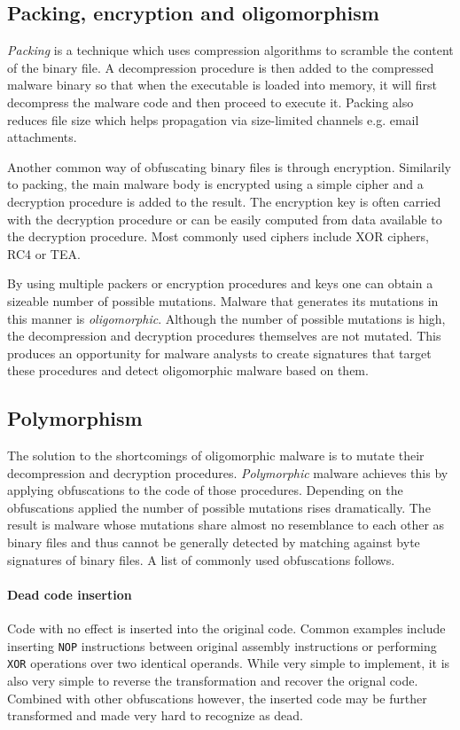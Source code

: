 \subsection{Packing, encryption and oligomorphism}
\emph{Packing} is a technique which uses compression algorithms to scramble the content of the binary file\cite{Symatec08}. A decompression procedure is then added to the compressed malware binary so that when the executable is loaded into memory, it will first decompress the malware code and then proceed to execute it. Packing also reduces file size which helps propagation via size-limited channels e.g. email attachments. 

Another common way of obfuscating binary files is through encryption. Similarily to packing, the main malware body is encrypted using a simple cipher and a decryption procedure is added to the result. The encryption key is often carried with the decryption procedure or can be easily computed from data available to the decryption procedure. Most commonly used ciphers include XOR ciphers, RC4 or TEA. 

By using multiple packers or encryption procedures and keys one can obtain a sizeable number of possible mutations. Malware that generates its mutations in this manner is \emph{oligomorphic}. Although the number of possible mutations is high, the decompression and decryption procedures themselves are not mutated. This produces an opportunity for malware analysts to create signatures that target these procedures and detect oligomorphic malware based on them.

\subsection{Polymorphism}
\label{s_polymorph}
The solution to the shortcomings of oligomorphic malware is to mutate their decompression and decryption procedures. \emph{Polymorphic} malware achieves this by applying obfuscations to the code of those procedures. Depending on the obfuscations applied the number of possible mutations rises dramatically. The result is malware whose mutations share almost no resemblance to each other as binary files and thus cannot be generally detected by matching against byte signatures of binary files. A list of commonly used obfuscations follows.

\paragraph*{Dead code insertion}
Code with no effect is inserted into the original code. Common examples include inserting \texttt{NOP} instructions between original assembly instructions or performing \texttt{XOR} operations over two identical operands. While very simple to implement, it is also very simple to reverse the transformation and recover the orignal code. Combined with other obfuscations however, the inserted code may be further transformed and made very hard to recognize as dead.

